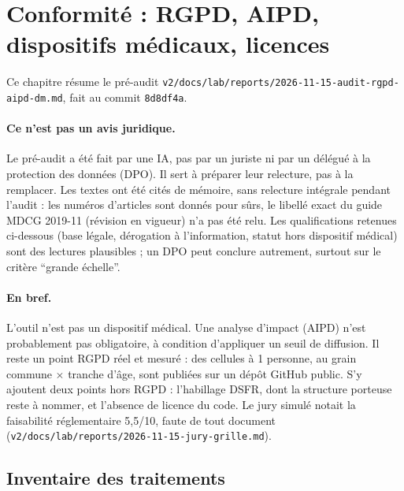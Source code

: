 \begingroup\sloppy
\section{Conformité : RGPD, AIPD, dispositifs médicaux, licences}\label{sec:conformite-ref}\label{conf:sec}

Ce chapitre résume le pré-audit \texttt{v2/\allowbreak{}docs/\allowbreak{}lab/\allowbreak{}reports/\allowbreak{}2026-\allowbreak{}11-\allowbreak{}15-\allowbreak{}audit-\allowbreak{}rgpd-\allowbreak{}aipd-\allowbreak{}dm.md}, fait au commit \texttt{8d8df4a}.

\paragraph{Ce n'est pas un avis juridique.}
Le pré-audit a été fait par une IA, pas par un juriste ni par un délégué à la protection des données (DPO).
Il sert à préparer leur relecture, pas à la remplacer.
Les textes ont été cités de mémoire, sans relecture intégrale pendant l'audit : les numéros d'articles sont donnés pour sûrs, le libellé exact du guide MDCG 2019-11 (révision en vigueur) n'a pas été relu.
Les qualifications retenues ci-dessous (base légale, dérogation à l'information, statut hors dispositif médical) sont des lectures plausibles ; un DPO peut conclure autrement, surtout sur le critère \enquote{grande échelle}.

\paragraph{En bref.}
L'outil n'est pas un dispositif médical\derive{}.
Une analyse d'impact (AIPD) n'est probablement pas obligatoire\derive{}, à condition d'appliquer un seuil de diffusion.
Il reste un point RGPD réel et mesuré : des cellules à 1 personne, au grain commune $\times$ tranche d'âge, sont publiées sur un dépôt GitHub public.
S'y ajoutent deux points hors RGPD : l'habillage DSFR, dont la structure porteuse reste à nommer, et l'absence de licence du code.
Le jury simulé notait la faisabilité réglementaire 5,5\suppose{}/10, faute de tout document (\texttt{v2/\allowbreak{}docs/\allowbreak{}lab/\allowbreak{}reports/\allowbreak{}2026-\allowbreak{}11-\allowbreak{}15-\allowbreak{}jury-\allowbreak{}grille.md}).

\subsection{Inventaire des traitements}\label{conf:inventaire}

